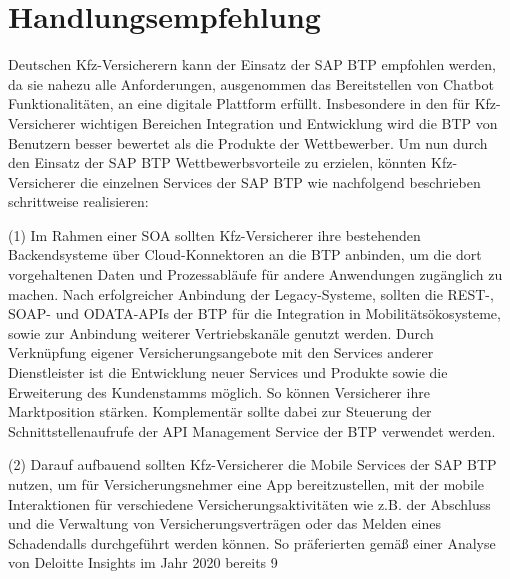 \chapter{Handlungsempfehlung}


Deutschen Kfz-Versicherern kann der Einsatz der SAP BTP empfohlen werden, da sie nahezu alle Anforderungen, ausgenommen das Bereitstellen von Chatbot Funktionalitäten, an eine digitale Plattform erfüllt. Insbesondere in den für Kfz-Versicherer wichtigen Bereichen Integration und Entwicklung wird die BTP von Benutzern besser bewertet als die Produkte der Wettbewerber. Um nun durch den Einsatz der SAP BTP Wettbewerbsvorteile zu erzielen, könnten Kfz-Versicherer die einzelnen Services der SAP BTP wie nachfolgend beschrieben schrittweise realisieren:

(1) Im Rahmen einer SOA sollten Kfz-Versicherer ihre bestehenden Backendsysteme über Cloud-Konnektoren an die BTP anbinden, um die dort vorgehaltenen Daten und Prozessabläufe für andere Anwendungen zugänglich zu machen. Nach erfolgreicher Anbindung der Legacy-Systeme, sollten die REST-, SOAP- und ODATA-APIs der BTP für die Integration in Mobilitätsökosysteme, sowie zur Anbindung weiterer Vertriebskanäle genutzt werden. Durch Verknüpfung eigener Versicherungsangebote mit den Services anderer Dienstleister ist die Entwicklung neuer Services und Produkte sowie die Erweiterung  des Kundenstamms möglich. So können Versicherer ihre Marktposition stärken. Komplementär sollte dabei zur Steuerung der Schnittstellenaufrufe der API Management Service der BTP verwendet werden.

(2) Darauf aufbauend sollten Kfz-Versicherer die Mobile Services der SAP BTP nutzen, um für Versicherungsnehmer eine App bereitzustellen, mit der mobile Interaktionen für verschiedene Versicherungsaktivitäten wie z.B. der Abschluss und die Verwaltung von Versicherungsverträgen oder das Melden eines Schadendalls durchgeführt werden können. So präferierten gemäß einer Analyse von Deloitte Insights im Jahr 2020 bereits 9%

